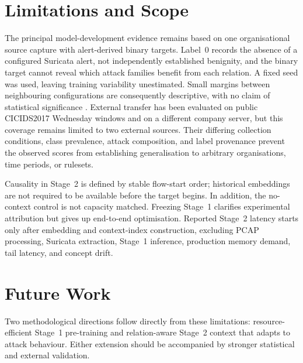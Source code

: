 \documentclass[11pt,fleqn]{report}
\begin{document}

\section{Limitations and Scope}
\label{subsec:conclusion_limitations}

The principal model-development evidence remains based on one organisational source capture with alert-derived binary targets. Label~0 records the absence of a configured Suricata alert, not independently established benignity, and the binary target cannot reveal which attack families benefit from each relation. A fixed seed was used, leaving training variability unestimated. Small margins between neighbouring configurations are consequently descriptive, with no claim of statistical significance \cite{ReimersGurevych2017,Bouthillier2021Variance}. External transfer has been evaluated on public CICIDS2017 Wednesday windows and on a different company server, but this coverage remains limited to two external sources. Their differing collection conditions, class prevalence, attack composition, and label provenance prevent the observed scores from establishing generalisation to arbitrary organisations, time periods, or rulesets.

Causality in Stage~2 is defined by stable flow-start order; historical embeddings are not required to be available before the target begins. In addition, the no-context control is not capacity matched. Freezing Stage~1 clarifies experimental attribution but gives up end-to-end optimisation. Reported Stage~2 latency starts only after embedding and context-index construction, excluding PCAP processing, Suricata extraction, Stage~1 inference, production memory demand, tail latency, and concept drift.

\section{Future Work}
\label{subsec:conclusion_future_work}

Two methodological directions follow directly from these limitations: resource-efficient Stage~1 pre-training and relation-aware Stage~2 context that adapts to attack behaviour. Either extension should be accompanied by stronger statistical and external validation.
\end{document}
